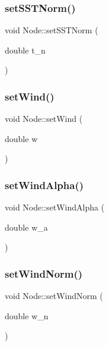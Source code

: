\mbox{\label{class_node_ac754bdd207b4bee7c3b59d9f82b8f06a}} 
\subsubsection{\texorpdfstring{setSSTNorm()}{setSSTNorm()}}
{\footnotesize\ttfamily void Node\+::set\+S\+S\+T\+Norm (\begin{DoxyParamCaption}\item[{double}]{t\+\_\+n }\end{DoxyParamCaption})\hspace{0.3cm}{\ttfamily [inline]}}

\mbox{\label{class_node_abac58416d7f51856d47a244475987b75}} 
\subsubsection{\texorpdfstring{setWind()}{setWind()}}
{\footnotesize\ttfamily void Node\+::set\+Wind (\begin{DoxyParamCaption}\item[{double}]{w }\end{DoxyParamCaption})\hspace{0.3cm}{\ttfamily [inline]}}

\mbox{\label{class_node_a22be445836c092729574d3bd5a97661f}} 
\subsubsection{\texorpdfstring{setWindAlpha()}{setWindAlpha()}}
{\footnotesize\ttfamily void Node\+::set\+Wind\+Alpha (\begin{DoxyParamCaption}\item[{double}]{w\+\_\+a }\end{DoxyParamCaption})\hspace{0.3cm}{\ttfamily [inline]}}

\mbox{\label{class_node_a32c8969f056f3ae9159faba9eae50169}} 
\subsubsection{\texorpdfstring{setWindNorm()}{setWindNorm()}}
{\footnotesize\ttfamily void Node\+::set\+Wind\+Norm (\begin{DoxyParamCaption}\item[{double}]{w\+\_\+n }\end{DoxyParamCaption})\hspace{0.3cm}{\ttfamily [inline]}}

